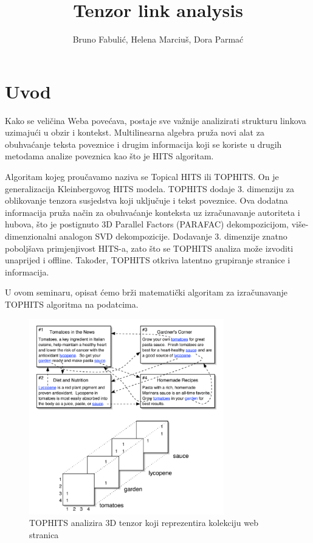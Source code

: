 \documentclass[11pt]{article}
\title{%
Tenzor link analysis}
\author{Bruno Fabuli\'{c}, Helena Marciu\v{s}, Dora Parma\'{c}}
\begin{document}
	\maketitle
	\newpage
	\hypersetup{linkcolor=black}
	\tableofcontents
\newpage
\hypersetup{linkcolor=blue}


\section{Uvod}
Kako se veličina Weba povećava, postaje sve važnije analizirati strukturu linkova uzimajući u obzir i kontekst.
Multilinearna algebra pruža novi alat za obuhvaćanje teksta poveznice i drugim informacija koji se koriste u drugih metodama analize poveznica kao što je HITS algoritam.

Algoritam kojeg proučavamo naziva se Topical HITS ili TOPHITS. On je generalizacija Kleinbergovog HITS modela. TOPHITS dodaje 3. dimenziju za oblikovanje tenzora susjedstva koji uključuje i tekst poveznice. Ova dodatna informacija pruža način za obuhvaćanje konteksta uz izračunavanje autoriteta i hubova, što je postignuto 3D Parallel Factors (PARAFAC) dekompozicijom, više-dimenzionalni analogon SVD dekompozicije.
Dodavanje 3. dimenzije znatno poboljšava primjenjivost HITS-a, zato što se TOPHITS analiza može izvoditi unaprijed i offline. Također, TOPHITS otkriva latentno grupiranje stranice i informacija.

U ovom seminaru, opisat ćemo brži matematički algoritam za izračunavanje TOPHITS algoritma na podatcima.

\begin{figure}[hbt!]
    \centering
    \includegraphics[width= \textwidth, height=85mm]{slika1.png}  
    \caption{TOPHITS analizira 3D tenzor koji reprezentira kolekciju web stranica}
\end{figure}
\end{document}
